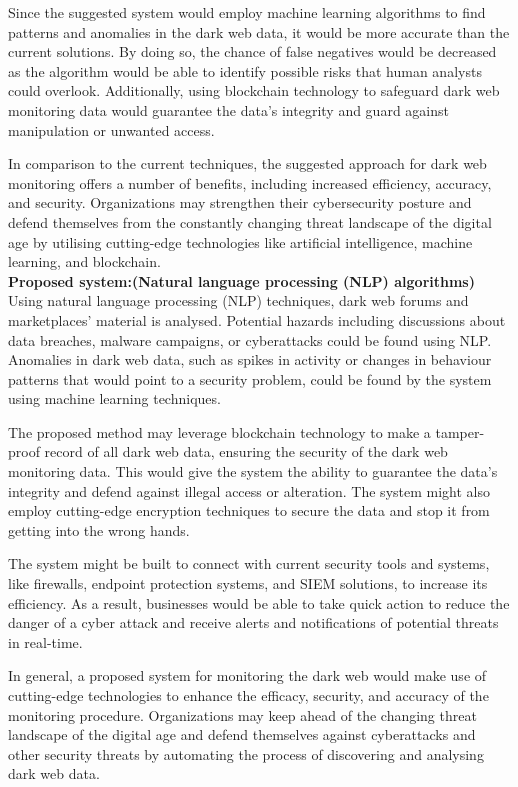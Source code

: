 \documentclass[10pt]{report}
\begin{document}
Since the suggested system would employ machine learning algorithms to find patterns and anomalies in the dark web data, it would be more accurate than the current solutions. By doing so, the chance of false negatives would be decreased as the algorithm would be able to identify possible risks that human analysts could overlook. Additionally, using blockchain technology to safeguard dark web monitoring data would guarantee the data's integrity and guard against manipulation or unwanted access.

In comparison to the current techniques, the suggested approach for dark web monitoring offers a number of benefits, including increased efficiency, accuracy, and security. Organizations may strengthen their cybersecurity posture and defend themselves from the constantly changing threat landscape of the digital age by utilising cutting-edge technologies like artificial intelligence, machine learning, and blockchain.\\
\textbf{Proposed system:(Natural language processing (NLP) algorithms)}\\ Using natural language processing (NLP) techniques, dark web forums and marketplaces' material is analysed. Potential hazards including discussions about data breaches, malware campaigns, or cyberattacks could be found using NLP. Anomalies in dark web data, such as spikes in activity or changes in behaviour patterns that would point to a security problem, could be found by the system using machine learning techniques.

The proposed method may leverage blockchain technology to make a tamper-proof record of all dark web data, ensuring the security of the dark web monitoring data. This would give the system the ability to guarantee the data's integrity and defend against illegal access or alteration. The system might also employ cutting-edge encryption techniques to secure the data and stop it from getting into the wrong hands.

The system might be built to connect with current security tools and systems, like firewalls, endpoint protection systems, and SIEM solutions, to increase its efficiency. As a result, businesses would be able to take quick action to reduce the danger of a cyber attack and receive alerts and notifications of potential threats in real-time.

In general, a proposed system for monitoring the dark web would make use of cutting-edge technologies to enhance the efficacy, security, and accuracy of the monitoring procedure. Organizations may keep ahead of the changing threat landscape of the digital age and defend themselves against cyberattacks and other security threats by automating the process of discovering and analysing dark web data.
\end{document}
